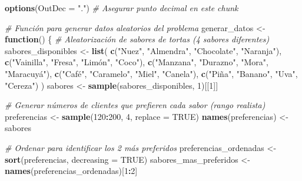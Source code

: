 \documentclass[
]{article}
\author{}
\date{\vspace{-2.5em}}
\newenvironment{Shaded}{\begin{snugshade}}{\end{snugshade}}
\newcommand{\AttributeTok}[1]{\textcolor[rgb]{0.13,0.29,0.53}{#1}}
\newcommand{\CommentTok}[1]{\textcolor[rgb]{0.56,0.35,0.01}{\textit{#1}}}
\newcommand{\ConstantTok}[1]{\textcolor[rgb]{0.56,0.35,0.01}{#1}}
\newcommand{\ControlFlowTok}[1]{\textcolor[rgb]{0.13,0.29,0.53}{\textbf{#1}}}
\newcommand{\DecValTok}[1]{\textcolor[rgb]{0.00,0.00,0.81}{#1}}
\newcommand{\FunctionTok}[1]{\textcolor[rgb]{0.13,0.29,0.53}{\textbf{#1}}}
\newcommand{\NormalTok}[1]{#1}
\newcommand{\OtherTok}[1]{\textcolor[rgb]{0.56,0.35,0.01}{#1}}
\newcommand{\SpecialCharTok}[1]{\textcolor[rgb]{0.81,0.36,0.00}{\textbf{#1}}}
\newcommand{\StringTok}[1]{\textcolor[rgb]{0.31,0.60,0.02}{#1}}
\begin{document}
\begin{Shaded}
\begin{Highlighting}[]
\FunctionTok{options}\NormalTok{(}\AttributeTok{OutDec =} \StringTok{"."}\NormalTok{)  }\CommentTok{\# Asegurar punto decimal en este chunk}

\CommentTok{\# Función para generar datos aleatorios del problema}
\NormalTok{generar\_datos }\OtherTok{\textless{}{-}} \ControlFlowTok{function}\NormalTok{() \{}
  \CommentTok{\# Aleatorización de sabores de tortas (4 sabores diferentes)}
\NormalTok{  sabores\_disponibles }\OtherTok{\textless{}{-}} \FunctionTok{list}\NormalTok{(}
    \FunctionTok{c}\NormalTok{(}\StringTok{"Nuez"}\NormalTok{, }\StringTok{"Almendra"}\NormalTok{, }\StringTok{"Chocolate"}\NormalTok{, }\StringTok{"Naranja"}\NormalTok{),}
    \FunctionTok{c}\NormalTok{(}\StringTok{"Vainilla"}\NormalTok{, }\StringTok{"Fresa"}\NormalTok{, }\StringTok{"Limón"}\NormalTok{, }\StringTok{"Coco"}\NormalTok{),}
    \FunctionTok{c}\NormalTok{(}\StringTok{"Manzana"}\NormalTok{, }\StringTok{"Durazno"}\NormalTok{, }\StringTok{"Mora"}\NormalTok{, }\StringTok{"Maracuyá"}\NormalTok{),}
    \FunctionTok{c}\NormalTok{(}\StringTok{"Café"}\NormalTok{, }\StringTok{"Caramelo"}\NormalTok{, }\StringTok{"Miel"}\NormalTok{, }\StringTok{"Canela"}\NormalTok{),}
    \FunctionTok{c}\NormalTok{(}\StringTok{"Piña"}\NormalTok{, }\StringTok{"Banano"}\NormalTok{, }\StringTok{"Uva"}\NormalTok{, }\StringTok{"Cereza"}\NormalTok{)}
\NormalTok{  )}
\NormalTok{  sabores }\OtherTok{\textless{}{-}} \FunctionTok{sample}\NormalTok{(sabores\_disponibles, }\DecValTok{1}\NormalTok{)[[}\DecValTok{1}\NormalTok{]]}
  
  \CommentTok{\# Generar números de clientes que prefieren cada sabor (rango realista)}
\NormalTok{  preferencias }\OtherTok{\textless{}{-}} \FunctionTok{sample}\NormalTok{(}\DecValTok{120}\SpecialCharTok{:}\DecValTok{200}\NormalTok{, }\DecValTok{4}\NormalTok{, }\AttributeTok{replace =} \ConstantTok{TRUE}\NormalTok{)}
  \FunctionTok{names}\NormalTok{(preferencias) }\OtherTok{\textless{}{-}}\NormalTok{ sabores}
  
  \CommentTok{\# Ordenar para identificar los 2 más preferidos}
\NormalTok{  preferencias\_ordenadas }\OtherTok{\textless{}{-}} \FunctionTok{sort}\NormalTok{(preferencias, }\AttributeTok{decreasing =} \ConstantTok{TRUE}\NormalTok{)}
\NormalTok{  sabores\_mas\_preferidos }\OtherTok{\textless{}{-}} \FunctionTok{names}\NormalTok{(preferencias\_ordenadas)[}\DecValTok{1}\SpecialCharTok{:}\DecValTok{2}\NormalTok{]}
  

\end{Highlighting}
\end{Shaded}
\end{document}
